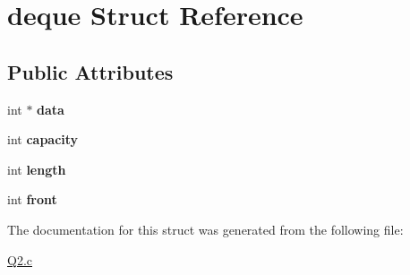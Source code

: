 \hypertarget{structdeque}{}\section{deque Struct Reference}
\label{structdeque}
\subsection*{Public Attributes}
\begin{DoxyCompactItemize}
\item 
\mbox{\label{structdeque_a3276bbb36a19df4cc42edb2267badb66}} 
int $\ast$ {\bfseries data}
\item 
\mbox{\label{structdeque_ab166704fe26a708dee6f36c5836da458}} 
int {\bfseries capacity}
\item 
\mbox{\label{structdeque_add5ed5ec3f2f77da548b9e9e4ab45dbc}} 
int {\bfseries length}
\item 
\mbox{\label{structdeque_a50ed9171bedf0d825145f74966212f12}} 
int {\bfseries front}
\end{DoxyCompactItemize}


The documentation for this struct was generated from the following file\+:\begin{DoxyCompactItemize}
\item 
\hyperlink{Q2_8c}{Q2.\+c}\end{DoxyCompactItemize}
